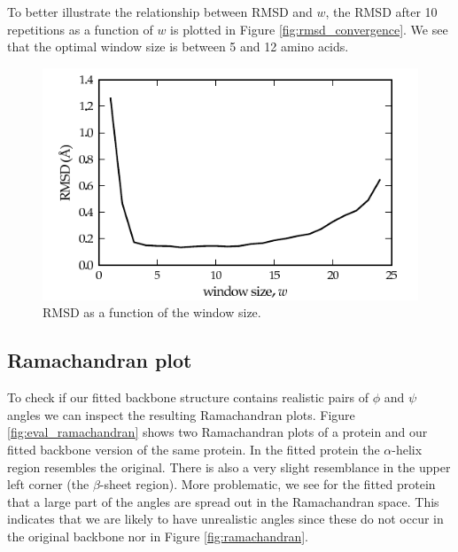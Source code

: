 To better illustrate the relationship between RMSD and $w$, the RMSD after 10 repetitions as a function of $w$ is plotted in Figure \ref{fig:rmsd_convergence}.
We see that the optimal window size is between 5 and 12 amino acids.
\begin{figure}
	\centering
	\hspace*{-3.5mm}\includegraphics[width=1.1\columnwidth]{figures/plot_rmsd}
	\caption{RMSD as a function of the window size.}
	\label{fig:rmsd_windowsize}
\end{figure}



\subsection{Ramachandran plot}
To check if our fitted backbone structure contains realistic pairs of $\phi$ and $\psi$ angles we can inspect the resulting Ramachandran plots.
Figure \ref{fig:eval_ramachandran} shows two Ramachandran plots of a protein and our fitted backbone version of the same protein.
In the fitted protein the $\alpha$-helix region resembles the original.
There is also a very slight resemblance in the upper left corner (the $\beta$-sheet region).
More problematic, we see for the fitted protein that a large part of the angles are spread out in the Ramachandran space.
This indicates that we are likely to have unrealistic angles since these do not occur in the original backbone nor in Figure \ref{fig:ramachandran}.

